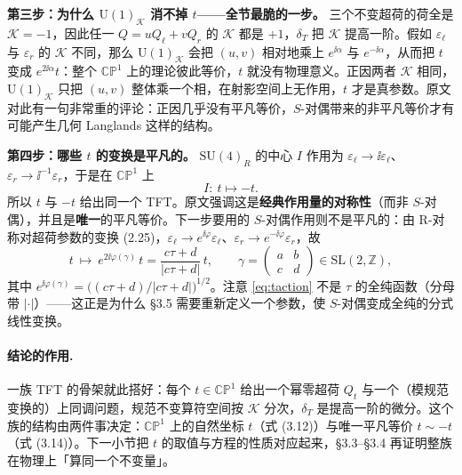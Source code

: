 \textbf{第三步：为什么 $\mathrm U(1)_{\mathcal K}$ 消不掉 $t$——全节最脆的一步。} 三个不变超荷的荷全是 $\mathcal K=-1$\pA{}，因此任一 $Q=uQ_\ell+vQ_r$ 的 $\mathcal K$ 都是 $+1$，$\delta_T$ 把 $\mathcal K$ 提高一阶。假如 $\varepsilon_\ell$ 与 $\varepsilon_r$ 的 $\mathcal K$ 不同，那么 $\mathrm U(1)_{\mathcal K}$ 会把 $(u,v)$ 相对地乘上 $e^{\ii\alpha}$ 与 $e^{-\ii\alpha}$，从而把 $t$ 变成 $e^{2\ii\alpha}t$：整个 $\mathbb{CP}^1$ 上的理论彼此等价，$t$ 就没有物理意义。正因两者 $\mathcal K$ 相同，$\mathrm U(1)_{\mathcal K}$ 只把 $(u,v)$ 整体乘一个相，在射影空间上无作用，$t$ 才是真参数\pA{}。原文对此有一句非常重的评论：正因几乎没有平凡等价，$S$-对偶带来的非平凡等价才有可能产生几何 Langlands 这样的结构\pA{}。

\textbf{第四步：哪些 $t$ 的变换是平凡的。} $\mathrm{SU}(4)_R$ 的中心 $I$ 作用为 $\varepsilon_\ell\to\ii\varepsilon_\ell$、$\varepsilon_r\to\ii^{-1}\varepsilon_r$，于是在 $\mathbb{CP}^1$ 上
\begin{equation}
I:\ t\longmapsto -t .
\label{eq:tminus}
\end{equation}
所以 $t$ 与 $-t$ 给出同一个 TFT。原文强调这是\textbf{经典作用量的对称性}（而非 $S$-对偶），并且是\textbf{唯一}的平凡等价\pA{}。下一步要用的 $S$-对偶作用则不是平凡的：由 R-对称对超荷参数的变换 (2.25)，$\varepsilon_\ell\to e^{\ii\varphi}\varepsilon_\ell$、$\varepsilon_r\to e^{-\ii\varphi}\varepsilon_r$，故
\begin{equation}
t\ \longmapsto\ e^{2\ii\varphi(\gamma)}\,t=\frac{c\tau+d}{|c\tau+d|}\,t,
\qquad
\gamma=\begin{pmatrix}a&b\\c&d\end{pmatrix}\in\mathrm{SL}(2,\mathbb Z),
\label{eq:taction}
\end{equation}
其中 $e^{\ii\varphi(\gamma)}=\bigl((c\tau+d)/|c\tau+d|\bigr)^{1/2}$\pA{}。注意 \eqref{eq:taction} 不是 $\tau$ 的全纯函数（分母带 $|\cdot|$）——这正是为什么 §3.5 需要重新定义一个参数，使 $S$-对偶变成全纯的分式线性变换。

\paragraph{结论的作用.}
一族 TFT 的骨架就此搭好：每个 $t\in\mathbb{CP}^1$ 给出一个幂零超荷 $Q_t$ 与一个（模规范变换的）上同调问题，规范不变算符空间按 $\mathcal K$ 分次，$\delta_T$ 是提高一阶的微分\pA{}。这个族的结构由两件事决定：$\mathbb{CP}^1$ 上的自然坐标 $t$（式 (3.12)）与唯一平凡等价 $t\sim-t$（式 (3.14)）。下一小节把 $t$ 的取值与方程的性质对应起来，§3.3–§3.4 再证明整族在物理上「算同一个不变量」。

